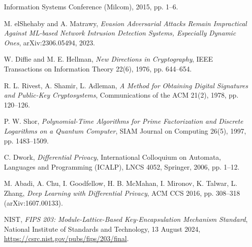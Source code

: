 \begin{sloppypar}
\begin{enumerate}[label={[\arabic*]},leftmargin=1.8em]
        Information Systems Conference (Milcom), 2015, pp. 1--6.
  \item M. elShehaby and A. Matrawy, \emph{Evasion Adversarial Attacks Remain
        Impractical Against ML-based Network Intrusion Detection Systems,
        Especially Dynamic Ones}, arXiv:2306.05494, 2023.
  \item W. Diffie and M. E. Hellman, \emph{New Directions in Cryptography},
        IEEE Transactions on Information Theory 22(6), 1976, pp. 644--654.
  \item R. L. Rivest, A. Shamir, L. Adleman, \emph{A Method for Obtaining Digital
        Signatures and Public-Key Cryptosystems}, Communications of the ACM 21(2),
        1978, pp. 120--126.
  \item P. W. Shor, \emph{Polynomial-Time Algorithms for Prime Factorization and
        Discrete Logarithms on a Quantum Computer}, SIAM Journal on Computing
        26(5), 1997, pp. 1483--1509.
  \item C. Dwork, \emph{Differential Privacy}, International Colloquium on
        Automata, Languages and Programming (ICALP), LNCS 4052, Springer, 2006,
        pp. 1--12.
  \item M. Abadi, A. Chu, I. Goodfellow, H. B. McMahan, I. Mironov, K. Talwar,
        L. Zhang, \emph{Deep Learning with Differential Privacy}, ACM CCS 2016,
        pp. 308--318 (arXiv:1607.00133).
  \item NIST, \emph{FIPS 203: Module-Lattice-Based Key-Encapsulation Mechanism
        Standard}, National Institute of Standards and Technology, 13 August
        2024, \url{https://csrc.nist.gov/pubs/fips/203/final}.
\end{enumerate}
\end{sloppypar}
